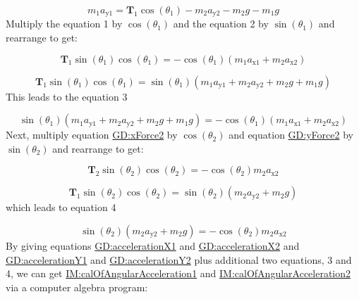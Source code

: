 \documentclass[12pt]{article}
\begin{document}
\begin{displaymath}
{m_{1}} {a_{\text{y}1}}={\symbf{T}_{1}} \cos\left({θ_{1}}\right)-{m_{2}} {a_{\text{y}2}}-{m_{2}} g-{m_{1}} g
\end{displaymath}
Multiply the equation 1 by $\cos\left({θ_{1}}\right)$ and the equation 2 by $\sin\left({θ_{1}}\right)$ and rearrange to get:

\begin{displaymath}
{\symbf{T}_{1}} \sin\left({θ_{1}}\right) \cos\left({θ_{1}}\right)=-\cos\left({θ_{1}}\right) \left({m_{1}} {a_{\text{x}1}}+{m_{2}} {a_{\text{x}2}}\right)
\end{displaymath}

\begin{displaymath}
{\symbf{T}_{1}} \sin\left({θ_{1}}\right) \cos\left({θ_{1}}\right)=\sin\left({θ_{1}}\right) \left({m_{1}} {a_{\text{y}1}}+{m_{2}} {a_{\text{y}2}}+{m_{2}} g+{m_{1}} g\right)
\end{displaymath}
This leads to the equation 3

\begin{displaymath}
\sin\left({θ_{1}}\right) \left({m_{1}} {a_{\text{y}1}}+{m_{2}} {a_{\text{y}2}}+{m_{2}} g+{m_{1}} g\right)=-\cos\left({θ_{1}}\right) \left({m_{1}} {a_{\text{x}1}}+{m_{2}} {a_{\text{x}2}}\right)
\end{displaymath}
Next, multiply equation \hyperref[GD:xForce2]{GD:xForce2} by $\cos\left({θ_{2}}\right)$ and equation \hyperref[GD:yForce2]{GD:yForce2} by $\sin\left({θ_{2}}\right)$ and rearrange to get:

\begin{displaymath}
{\symbf{T}_{2}} \sin\left({θ_{2}}\right) \cos\left({θ_{2}}\right)=-\cos\left({θ_{2}}\right) {m_{2}} {a_{\text{x}2}}
\end{displaymath}

\begin{displaymath}
{\symbf{T}_{1}} \sin\left({θ_{2}}\right) \cos\left({θ_{2}}\right)=\sin\left({θ_{2}}\right) \left({m_{2}} {a_{\text{y}2}}+{m_{2}} g\right)
\end{displaymath}
which leads to equation 4

\begin{displaymath}
\sin\left({θ_{2}}\right) \left({m_{2}} {a_{\text{y}2}}+{m_{2}} g\right)=-\cos\left({θ_{2}}\right) {m_{2}} {a_{\text{x}2}}
\end{displaymath}
By giving equations \hyperref[GD:accelerationX1]{GD:accelerationX1} and \hyperref[GD:accelerationX2]{GD:accelerationX2} and \hyperref[GD:accelerationY1]{GD:accelerationY1} and \hyperref[GD:accelerationY2]{GD:accelerationY2} plus additional two equations, 3 and 4, we can get \hyperref[IM:calOfAngularAcceleration1]{IM:calOfAngularAcceleration1} and \hyperref[IM:calOfAngularAcceleration2]{IM:calOfAngularAcceleration2} via a computer algebra program:
\end{document}
